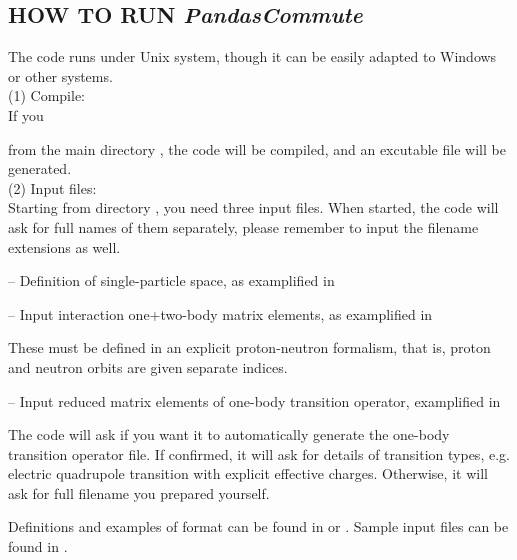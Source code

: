 \documentclass{article}
\begin{document}
\begin{spacing}{1.5}
\section{HOW TO RUN  {\it PandasCommute}}
The code runs under Unix system, though it can be easily adapted to Windows or other systems.\\

(1) Compile:\\

If you 

from the main directory , the code will be compiled, and an excutable file  will be generated.\\

(2) Input files:\\

Starting from directory , you need three input files. 
When started, the code will ask for full names of them separately, please remember to input the filename extensions as well.

-- Definition of single-particle space, as examplified in 

-- Input interaction one+two-body matrix elements, as examplified in 

These must be defined in an explicit proton-neutron formalism, that is, proton and neutron orbits are given separate indices. 

-- Input reduced matrix elements of one-body transition operator, examplified in 

The code will ask if you want it to automatically generate the one-body transition operator file. 
If confirmed, it will ask for details of transition types, e.g. electric quadrupole transition with explicit effective charges.
Otherwise, it will ask for full filename you prepared yourself.

Definitions and examples of format can be found in  or .
Sample input files can be found in .


\end{spacing}
\end{document}
